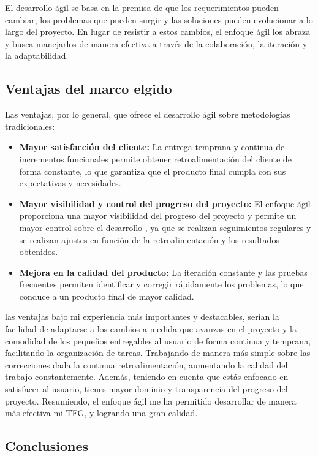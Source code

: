 El desarrollo ágil se basa en la premisa de que los requerimientos pueden cambiar, los problemas que 
pueden surgir y las soluciones pueden evolucionar a lo largo del proyecto. En lugar de resistir a estos 
cambios, el enfoque ágil los abraza y busca manejarlos de manera efectiva a través de la colaboración, 
la iteración y la adaptabilidad.

\subsection{Ventajas del marco elgido}

Las ventajas, por lo general, que ofrece el desarrollo ágil sobre metodologías tradicionales:

\begin{itemize}
\item \textbf{Mayor satisfacción del cliente:} La entrega temprana y continua de incrementos 
funcionales permite obtener retroalimentación del cliente de forma constante, lo que garantiza que el 
producto final cumpla con sus expectativas y necesidades.
\item \textbf{Mayor visibilidad y control del progreso del proyecto:} El enfoque ágil proporciona una 
mayor visibilidad del progreso del proyecto y permite un mayor control sobre el desarrollo 
\cite{VCagileT}, ya que se realizan seguimientos regulares y se realizan ajustes en función de la 
retroalimentación y los resultados obtenidos.
\item \textbf{Mejora en la calidad del producto:} La iteración constante y las pruebas frecuentes 
permiten identificar y corregir rápidamente los problemas, lo que conduce a un producto final de mayor 
calidad.
\end{itemize}

las ventajas bajo mi experiencia más importantes y destacables, serían la facilidad de adaptarse a los 
cambios a medida que avanzas en el proyecto y la comodidad de los pequeños entregables al usuario de 
forma continua y temprana, facilitando la organización de tareas. Trabajando de manera más simple sobre 
las correcciones dada la continua retroalimentación, aumentando la calidad del trabajo constantemente. 
Además, teniendo en cuenta que estás enfocado en satisfacer al usuario, tienes mayor dominio y 
transparencia del progreso del proyecto. Resumiendo, el enfoque ágil me ha permitido desarrollar de 
manera más efectiva mi TFG, y logrando una gran calidad.


\subsection{Conclusiones}

